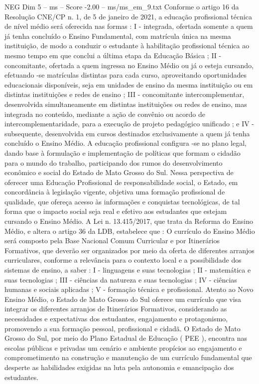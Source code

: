 \begin{textsample}{NEG Dim 5 – ms – Score -2.00 – ms/ms\_em\_9.txt}
Conforme o artigo 16 da Resolução CNE/CP n. 1, de 5 de janeiro de 2021, a educação profissional técnica de nível médio será oferecida nas formas : I - integrada, ofertada somente a quem já tenha concluído o Ensino Fundamental, com matrícula única na mesma instituição, de modo a conduzir o estudante à habilitação profissional técnica ao mesmo tempo em que conclui a última etapa da Educação Básica ; II - concomitante, ofertada a quem ingressa no Ensino Médio ou já o esteja cursando, efetuando -se matrículas distintas para cada curso, aproveitando oportunidades educacionais disponíveis, seja em unidades de ensino da mesma instituição ou em distintas instituições e redes de ensino ; III - concomitante intercomplementar, desenvolvida simultaneamente em distintas instituições ou redes de ensino, mas integrada no conteúdo, mediante a ação de convênio ou acordo de intercomplementaridade, para a execução de projeto pedagógico unificado ; e IV - subsequente, desenvolvida em cursos destinados exclusivamente a quem já tenha concluído o Ensino Médio.
A educação profissional configura -se no plano legal, dando base à formulação e implementação de políticas que formam o cidadão para o mundo do trabalho, participando dos rumos do desenvolvimento econômico e social do Estado de Mato Grosso do Sul.
Nessa perspectiva de oferecer uma Educação Profissional de responsabilidade social, o Estado, em concordância à legislação vigente, objetiva uma formação profissional de qualidade, que ofereça acesso às informações e conquistas tecnológicas, de tal forma que o impacto social seja real e efetivo aos estudantes que estejam cursando o Ensino Médio.
A Lei n. 13.415/2017, que trata da Reforma do Ensino Médio, e altera o artigo 36 da LDB, estabelece que : O currículo do Ensino Médio será composto pela Base Nacional Comum Curricular e por Itinerários Formativos, que deverão ser organizados por meio da oferta de diferentes arranjos curriculares, conforme a relevância para o contexto local e a possibilidade dos sistemas de ensino, a saber : I - linguagens e suas tecnologias ; II - matemática e suas tecnologias ; III - ciências da natureza e suas tecnologias ; IV - ciências humanas e sociais aplicadas ; V - formação técnica e profissional.
Atento ao Novo Ensino Médio, o Estado de Mato Grosso do Sul oferece um currículo que visa integrar os diferentes arranjos de Itinerários Formativos, considerando as necessidades e expectativas dos estudantes, engajamento e protagonismo, promovendo a sua formação pessoal, profissional e cidadã.
O Estado de Mato Grosso do Sul, por meio do Plano Estadual de Educação ( PEE ), encontra nas escolas públicas e privadas um cenário e ambiente propícios ao engajamento e comprometimento na construção e manutenção de um currículo fundamental que desperte as habilidades exigidas na luta pela autonomia e emancipação dos estudantes.

\end{textsample}
